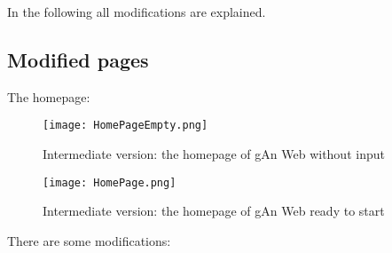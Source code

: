 In the following all modifications are explained.

\subsection{Modified pages}
The homepage:

\begin{figure}[H]
\centering
\texttt{[image: HomePageEmpty.png]} 
\caption{Intermediate version: the homepage of gAn Web without input}
\end{figure}


\begin{figure}[H]
\centering
\texttt{[image: HomePage.png]} 
\caption{Intermediate version: the homepage of gAn Web ready to start}
\end{figure}

There are some modifications:

